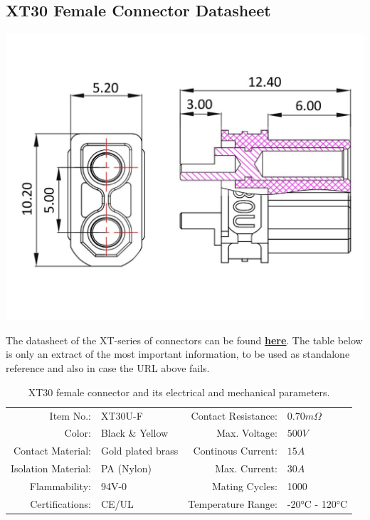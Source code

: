 \subsection{XT30 Female Connector Datasheet}

\includegraphics[width=\textwidth]{contents/figures/xt30_f.jpg}

The datasheet of the XT-series of connectors can be found \href{https://www.lcsc.com/datasheet/lcsc_datasheet_2304140030_Changzhou-Amass-Elec-XT30U-F_C99102.pdf}{\textbf{\underline{here}}}.
The table below is only an extract of the most important information, to be used as standalone reference and also in case the URL above fails.

\begin{table}[h] %
    \begin{tabular}{rlrl}
         Item No.:&  XT30U-F &  Contact Resistance:& $0.70m \Omega$\\
         Color:&  Black \& Yellow&  Max. Voltage:& $500V$\\
         Contact Material:&  Gold plated brass&  Continous Current:& $15A$\\
         Isolation Material:&  PA (Nylon)&  Max. Current:& $30A$\\
         Flammability:&  94V-0&  Mating Cycles:& 1000\\
         Certifications:&  CE/UL&  Temperature Range:& -20°C - 120°C\\
    \end{tabular}
    \caption{XT30 female connector and its electrical and mechanical parameters.}
    \label{xt30_f_specs}
\end{table}

